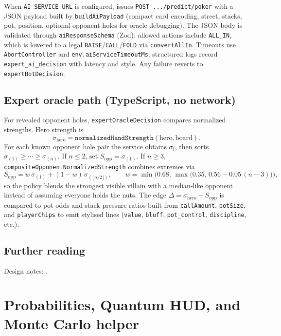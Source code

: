\documentclass[11pt,a4paper]{article}
\begin{document}
When \texttt{AI\_SERVICE\_URL} is configured,  issues \texttt{POST .../predict/poker} with a JSON payload built by \texttt{buildAiPayload} (compact card encoding, street, stacks, pot, position, optional opponent holes for oracle debugging). The JSON body is validated through \texttt{aiResponseSchema} (Zod): allowed actions include \texttt{ALL\_IN}, which is lowered to a legal \texttt{RAISE}/\texttt{CALL}/\texttt{FOLD} via \texttt{convertAllIn}. Timeouts use \texttt{AbortController} and \texttt{env.aiServiceTimeoutMs}; structured logs record \texttt{expert\_ai\_decision} with latency and style. Any failure reverts to \texttt{expertBotDecision}.

\subsection{Expert oracle path (TypeScript, no network)}

For revealed opponent holes, \texttt{expertOracleDecision} compares normalized strengths. Hero strength is
\[
\sigma_{\mathrm{hero}}=\texttt{normalizedHandStrength}(\text{hero},\text{board}).
\]
For each known opponent hole pair the service obtains $\sigma_i$, then sorts $\sigma_{(1)}\ge\cdots\ge\sigma_{(n)}$. If $n\le 2$, set $S_{\mathrm{opp}}=\sigma_{(1)}$. If $n\ge 3$, \texttt{compositeOpponentNormalizedStrength} combines extremes via
\[
S_{\mathrm{opp}} = w\,\sigma_{(1)} + (1-w)\,\sigma_{(\lfloor n/2\rfloor)},
\qquad
w = \min\bigl(0.68,\,\max\bigl(0.35,\,0.56 - 0.05\,(n-3)\bigr)\bigr),
\]
so the policy blends the strongest visible villain with a median-like opponent instead of assuming everyone holds the nuts. The edge $\Delta=\sigma_{\mathrm{hero}}-S_{\mathrm{opp}}$ is compared to pot odds and stack pressure ratios built from \texttt{callAmount}, \texttt{potSize}, and \texttt{playerChips} to emit stylised lines (\texttt{value}, \texttt{bluff}, \texttt{pot\_control}, \texttt{discipline}, etc.).

\subsection{Further reading}

Design notes: .

\section{Probabilities, Quantum HUD, and Monte Carlo helper}
\label{app:hud}
\end{document}
